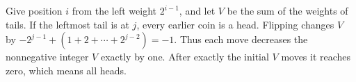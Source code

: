 Give position $i$ from the left weight $2^{i-1}$, and let $V$ be the sum of the weights of tails. If the leftmost tail is at $j$, every earlier coin is a head. Flipping changes $V$ by $-2^{j-1}+(1+2+\cdots+2^{j-2})=-1$. Thus each move decreases the nonnegative integer $V$ exactly by one. After exactly the initial $V$ moves it reaches zero, which means all heads.
